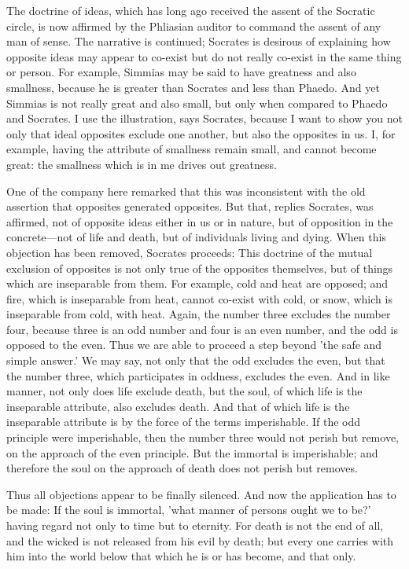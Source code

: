 \documentclass[11pt,letter]{article}
\begin{document}
\par  The doctrine of ideas, which has long ago received the assent of the Socratic circle, is now affirmed by the Phliasian auditor to command the assent of any man of sense. The narrative is continued; Socrates is desirous of explaining how opposite ideas may appear to co-exist but do not really co-exist in the same thing or person. For example, Simmias may be said to have greatness and also smallness, because he is greater than Socrates and less than Phaedo. And yet Simmias is not really great and also small, but only when compared to Phaedo and Socrates. I use the illustration, says Socrates, because I want to show you not only that ideal opposites exclude one another, but also the opposites in us. I, for example, having the attribute of smallness remain small, and cannot become great: the smallness which is in me drives out greatness.

\par  One of the company here remarked that this was inconsistent with the old assertion that opposites generated opposites. But that, replies Socrates, was affirmed, not of opposite ideas either in us or in nature, but of opposition in the concrete—not of life and death, but of individuals living and dying. When this objection has been removed, Socrates proceeds: This doctrine of the mutual exclusion of opposites is not only true of the opposites themselves, but of things which are inseparable from them. For example, cold and heat are opposed; and fire, which is inseparable from heat, cannot co-exist with cold, or snow, which is inseparable from cold, with heat. Again, the number three excludes the number four, because three is an odd number and four is an even number, and the odd is opposed to the even. Thus we are able to proceed a step beyond 'the safe and simple answer.' We may say, not only that the odd excludes the even, but that the number three, which participates in oddness, excludes the even. And in like manner, not only does life exclude death, but the soul, of which life is the inseparable attribute, also excludes death. And that of which life is the inseparable attribute is by the force of the terms imperishable. If the odd principle were imperishable, then the number three would not perish but remove, on the approach of the even principle. But the immortal is imperishable; and therefore the soul on the approach of death does not perish but removes.

\par  Thus all objections appear to be finally silenced. And now the application has to be made: If the soul is immortal, 'what manner of persons ought we to be?' having regard not only to time but to eternity. For death is not the end of all, and the wicked is not released from his evil by death; but every one carries with him into the world below that which he is or has become, and that only.
\end{document}
